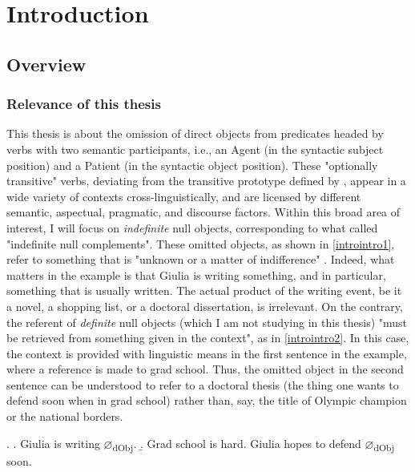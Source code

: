 \setchapterpreamble[u]{\margintoc}
\chapter{Introduction}

\section{Overview} 

\subsection{Relevance of this thesis}

This thesis is about the omission of direct objects from predicates headed by verbs with two semantic participants, i.e., an Agent (in the syntactic subject position) and a Patient (in the syntactic object position). These "optionally transitive" verbs, deviating from the transitive prototype defined by \textcite{HopperThompson1980}, appear in a wide variety of contexts cross-linguistically, and are licensed by different semantic, aspectual, pragmatic, and discourse factors. Within this broad area of interest, I will focus on \textit{indefinite} null objects, corresponding to what \textcite{Fillmore1986} called "indefinite null complements". These omitted objects, as shown in \ref{introintro1}, refer to something that is "unknown or a matter of indifference" \parencite[96]{Fillmore1986}. Indeed, what matters in the example is that Giulia is writing something, and in particular, something that is usually written. The actual product of the writing event, be it a novel, a shopping list, or a doctoral dissertation, is irrelevant. On the contrary, the referent of \textit{definite} null objects (which I am not studying in this thesis) "must be retrieved from something given in the context", as in \ref{introintro2}. In this case, the context is provided with linguistic means in the first sentence in the example, where a reference is made to grad school. Thus, the omitted object in the second sentence can be understood to refer to a doctoral thesis (the thing one wants to defend soon when in grad school) rather than, say, the title of Olympic champion or the national borders.

\ex. \label{introintro} \a. \label{introintro1} Giulia is writing $\varnothing$\textsubscript{dObj}.
\b. \label{introintro2} Grad school is hard. Giulia hopes to defend $\varnothing$\textsubscript{dObj} soon.

